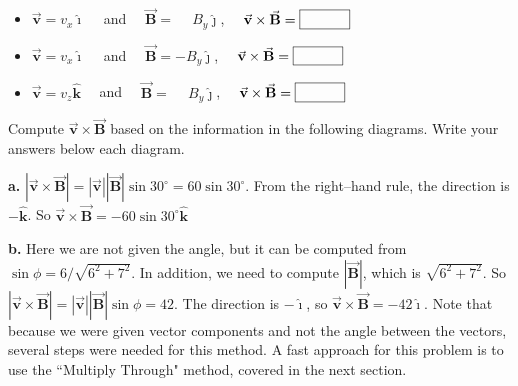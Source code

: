\documentclass{article}
\newcommand{\ihat}[0]{\hat{\boldsymbol{\imath}}}
\newcommand{\jhat}[0]{\hat{\boldsymbol{\jmath}}}
\newcommand{\khat}[0]{\hat{\boldsymbol{k}}}
\newcommand{\bfvec}[1]{\vec{\mathbf{#1}}}
\begin{document}
    \begin{itemize}

      \item $\bfvec{v}=v_x\ihat\quad$ and $\quad\bfvec{B}=\phantom{-}B_y\jhat$, $\quad\bfvec{v}\times\bfvec{B} = \fbox{\qquad\phantom M}$

    \end{itemize}

\vskip 60pt

    \begin{itemize}

      \item $\bfvec{v}=v_x\ihat\quad$ and $\quad\bfvec{B}=-B_y\jhat$, $\quad\bfvec{v}\times\bfvec{B} = \fbox{\qquad\phantom M}$

    \end{itemize}

\vskip 60pt

    \begin{itemize}

      \item $\bfvec{v}=v_z\khat\quad$ and $\quad\bfvec{B}=\phantom{-}B_y\jhat$, $\quad\bfvec{v}\times\bfvec{B} = \fbox{\qquad\phantom M}$

    \end{itemize}
\fi

\vskip 36pt

\vskip 0.75pt

Compute $\bfvec{v}\times\bfvec{B}$ based on the information in the following diagrams. Write your answers below each diagram.



\ifsolutions
\textbf{a.}
$|\bfvec{v}\times\bfvec{B}| = |\bfvec{v}||\bfvec{B}|\sin 30^\circ = 60\sin 30^\circ$. From the right--hand rule, the direction is $-\khat$. So $\bfvec{v}\times\bfvec{B}=-60\sin 30^\circ\khat$

\textbf{b.} Here we are not given the angle, but it can be computed from $\sin\phi=6/\sqrt{6^2+7^2}$. In addition, we need to compute $|\bfvec{B}|$, which is $\sqrt{6^2+7^2}$. So $|\bfvec{v}\times\bfvec{B}| = |\bfvec{v}||\bfvec{B}|\sin\phi = 42$. The direction is $-\ihat$, so $\bfvec{v}\times\bfvec{B}=-42\ihat$. Note that because we were given vector components and not the angle between the vectors, several steps were needed for this method. A fast approach for this problem is to use the ``Multiply Through" method, covered in the next section.
\else

\newpage
\fi
\end{document}

